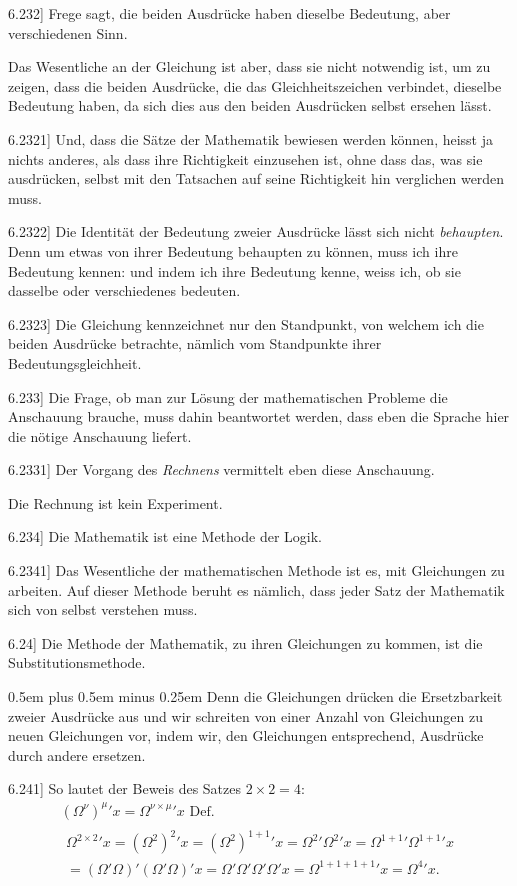 \documentclass[12pt,oneside]{book}[2007/10/19]
\newcommand{\PropERef}[1]{\hyperref[PropE:#1]{#1}}
\newcommand{\PropositionG}[2]{%
  \item[\phantomsection\label{PropG:#1}\PropERef{#1}] #2%
}
\newcommand{\Emph}[1]{\emph{#1}}%
\newcommand{\verystretchyspace}{\spaceskip0.5em plus 0.5em minus 0.25em}
\begin{document}
\begin{propositions}
\PropositionG{6.232}
{Frege sagt, die beiden Ausdrücke haben dieselbe
Bedeutung, aber verschiedenen Sinn.

Das Wesentliche an der Gleichung ist aber, dass
sie nicht notwendig ist, um zu zeigen, dass die beiden
Ausdrücke, die das Gleichheitszeichen verbindet,
dieselbe Bedeutung haben, da sich dies aus den
beiden Ausdrücken selbst ersehen lässt.}


\PropositionG{6.2321}
{Und, dass die Sätze der Mathematik bewiesen
werden können, heisst ja nichts anderes, als dass
ihre Richtigkeit einzusehen ist, ohne dass das, was
sie ausdrücken, selbst mit den Tatsachen auf seine
Richtigkeit hin verglichen werden muss.}


\PropositionG{6.2322}
{Die Identität der Bedeutung zweier Ausdrücke
lässt sich nicht \Emph{behaupten}. Denn um etwas von
ihrer Bedeutung behaupten zu können, muss ich
ihre Bedeutung kennen: und indem ich ihre Bedeutung
kenne, weiss ich, ob sie dasselbe oder
verschiedenes bedeuten.}


\PropositionG{6.2323}
{Die Gleichung kennzeichnet nur den Standpunkt,
von welchem ich die beiden Ausdrücke
betrachte, nämlich vom Standpunkte ihrer Bedeutungsgleichheit.}


\PropositionG{6.233}
{Die Frage, ob man zur Lösung der mathematischen
Probleme die Anschauung brauche, muss
dahin beantwortet werden, dass eben die Sprache
hier die nötige Anschauung liefert.}


\PropositionG{6.2331}
{Der Vorgang des \Emph{Rechnens} vermittelt eben
diese Anschauung.

Die Rechnung ist kein Experiment.}


\PropositionG{6.234}
{Die Mathematik ist eine Methode der Logik.}


\PropositionG{6.2341}
{Das Wesentliche der mathematischen Methode
ist es, mit Gleichungen zu arbeiten. Auf dieser
Methode beruht es nämlich, dass jeder Satz der
Mathematik sich von selbst verstehen muss.}


\PropositionG{6.24}
{Die Methode der Mathematik, zu ihren Gleichungen
zu kommen, ist die Substitutionsmethode.

{\verystretchyspace
Denn die Gleichungen drücken die Ersetzbarkeit
zweier Ausdrücke aus und wir schreiten von einer
Anzahl von Gleichungen zu neuen Gleichungen
vor, indem wir, den Gleichungen entsprechend,
Ausdrücke durch andere ersetzen.}}


\PropositionG{6.241}
{So lautet der Beweis des Satzes $2 \times 2 = 4$:
\begin{gather*}
(\Omega^{\nu})^{\mu}{}'x = \Omega^{\nu \times \mu}{}'x \text{ Def.}\\
\begin{split}
\Omega^{2 \times 2}{}'x = (\Omega^{2})^{2}{}'x = (\Omega^{2})^{1 + 1}{}'x = \Omega^{2}{}'\Omega^{2}{}'x = \Omega^{1 + 1}{}'\Omega^{1 + 1}{}'x\\
= (\Omega'\Omega)'(\Omega'\Omega)'x = \Omega'\Omega'\Omega'\Omega'x = \Omega^{1 + 1 + 1 + 1}{}'x = \Omega^{4}{}'x.
\end{split}
\end{gather*}
}



\end{propositions}
\end{document}
